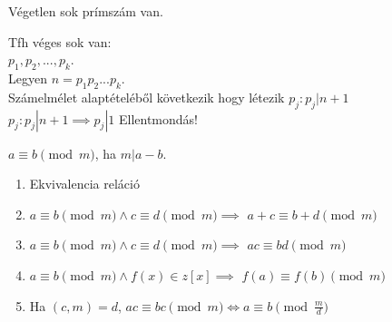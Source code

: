 \begin{frame}

\begin{tcolorbox}[title={Tétel: Eukleidész tétele}]
Végetlen sok prímszám van.
\end{tcolorbox}

\begin{tcolorbox}[title={Bizonyítás (Indirekt)}]
Tfh véges sok van:\\
$p_1, p_2, ... ,p_k$.\\
Legyen $n = p_1p_2...p_k$.\\
Számelmélet alaptételéből következik hogy létezik $p_j : p_j | n + 1$\\
$p_j : p_j | n + 1 \implies p_j | 1$ Ellentmondás!
\end{tcolorbox}
\end{frame}

\begin{frame}
\begin{tcolorbox}[title={Def.: Kanonikus alak, Módosított kanonikus alak}]
\end{tcolorbox}

\begin{tcolorbox}[title={Def.: Erathosztenész SZitája}]
\end{tcolorbox}
\end{frame}

\begin{frame}

\begin{tcolorbox}[title={Def.: Lineáris Kongruencia}]
$a \equiv b \pmod{m}$, ha $m | a - b$.
\end{tcolorbox}

\begin{tcolorbox}[title={Tétel: Kongruencia tulajdonságai}]
\begin{enumerate}
\item Ekvivalencia reláció
\item $a \equiv b \pmod{m} \land c \equiv d \pmod{m} \implies$ \textbf{$a + c \equiv b + d \pmod{m}$}
\item $a \equiv b \pmod{m} \land c \equiv d \pmod{m} \implies$ \textbf{$ac \equiv bd \pmod{m}$}
\item $a \equiv b \pmod{m} \land f(x) \in z[x] \implies$ \textbf{$f(a) \equiv f(b) \pmod{m}$}
\item Ha $(c, m) = d$, $ac \equiv bc \pmod{m} \iff a \equiv b \pmod{\frac{m}{d}}$
\end{enumerate}
\end{tcolorbox}

\begin{tcolorbox}[title={Ész}]
\end{tcolorbox}
\end{frame}


